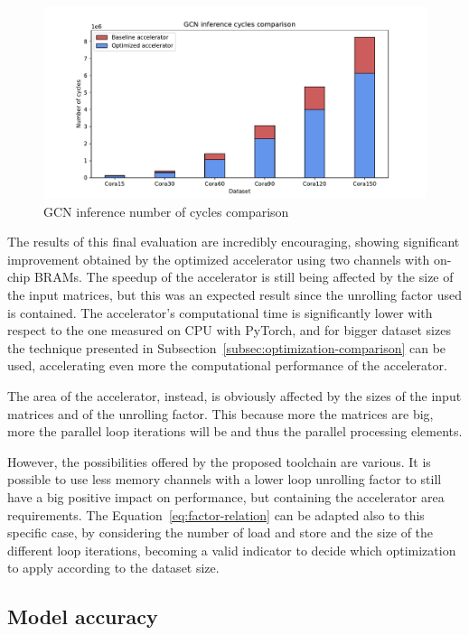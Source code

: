 \begin{figure}[t!]
    \centering
    \includegraphics[height=0.4\textwidth]{Images/gcn_forward_cycles_comparison}
    \caption{GCN inference number of cycles comparison}
    \label{fig:gcn-inference-cycles-comparison}
\end{figure}

The results of this final evaluation are incredibly encouraging, showing significant improvement obtained by the optimized accelerator using two channels with on-chip BRAMs.
The speedup of the accelerator is still being affected by the size of the input matrices, but this was an expected result since the unrolling factor used is contained.
The accelerator's computational time is significantly lower with respect to the one measured on CPU with PyTorch, and for bigger dataset sizes the technique presented in Subsection~\ref{subsec:optimization-comparison} can be used, accelerating even more the computational performance of the accelerator.

The area of the accelerator, instead, is obviously affected by the sizes of the input matrices and of the unrolling factor.
This because more the matrices are big, more the parallel loop iterations will be and thus the parallel processing elements.

However, the possibilities offered by the proposed toolchain are various.
It is possible to use less memory channels with a lower loop unrolling factor to still have a big positive impact on performance, but containing the accelerator area requirements.
The Equation~\ref{eq:factor-relation} can be adapted also to this specific case, by considering the number of load and store and the size of the different loop iterations, becoming a valid indicator to decide which optimization to apply according to the dataset size.

\subsection{Model accuracy}
\label{subsec:modeol-accuracy}%


